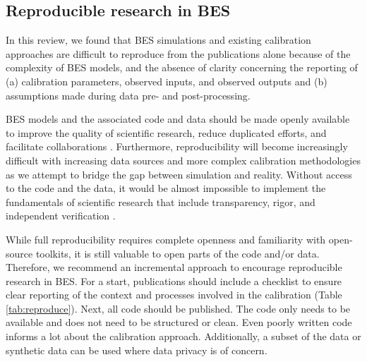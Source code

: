\documentclass[review]{elsarticle}
\begin{document}
\subsection{Reproducible research in BES} \label{sec:reproduce}

In this review, we found that BES simulations and existing calibration approaches are difficult to reproduce from the publications alone because of the complexity of BES models, and the absence of clarity concerning the reporting of (a) calibration parameters, observed inputs, and observed outputs and (b) assumptions made during data pre- and post-processing.

BES models and the associated code and data should be made openly available to improve the quality of scientific research, reduce duplicated efforts, and facilitate collaborations \cite{pfenninger2017importance}. Furthermore, reproducibility will become increasingly difficult with increasing data sources and more complex calibration methodologies as we attempt to bridge the gap between simulation and reality. Without access to the code and the data, it would be almost impossible to implement the fundamentals of scientific research that include transparency, rigor, and independent verification \cite{mcnutt2014journals, pfenninger2017importance}. 

While full reproducibility requires complete openness and familiarity with open-source toolkits, it is still valuable to open parts of the code and/or data. Therefore, we recommend an incremental approach to encourage reproducible research in BES. For a start, publications should include a checklist to ensure clear reporting of the context and processes involved in the calibration (Table \ref{tab:reproduce}). Next, all code should be published. The code only needs to be available and does not need to be structured or clean. Even poorly written code informs a lot about the calibration approach. Additionally, a subset of the data or synthetic data can be used where data privacy is of concern. 
\end{document}

